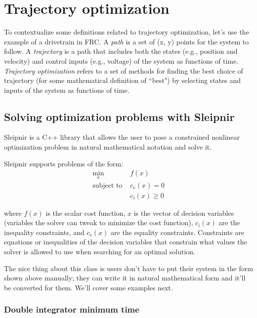 
\chapter{Trajectory optimization}

To contextualize some definitions related to trajectory optimization, let's use
the example of a drivetrain in FRC. A \textit{path} is a set of (x, y) points
for the \gls{system} to follow. A \textit{trajectory} is a path that includes
both the states (e.g., position and velocity) and control inputs (e.g., voltage)
of the \gls{system} as functions of time. \textit{Trajectory optimization}
refers to a set of methods for finding the best choice of trajectory (for some
mathematical definition of ``best") by selecting states and inputs of the
\gls{system} as functions of time.

\section{Solving optimization problems with Sleipnir}

Sleipnir is a C++ library that allows the user to pose a constrained nonlinear
optimization problem in natural mathematical notation and solve it.

Sleipnir supports problems of the form:
\begin{align*}
  \min_x             &f(x) \\
  \text{subject to } &c_e(x) = 0 \\
                     &c_i(x) \geq 0
\end{align*}

where $f(x)$ is the scalar cost function, $x$ is the vector of decision
variables (variables the solver can tweak to minimize the cost function),
$c_i(x)$ are the inequality constraints, and $c_e(x)$ are the equality
constraints. Constraints are equations or inequalities of the decision variables
that constrain what values the solver is allowed to use when searching for an
optimal solution.

The nice thing about this class is users don't have to put their system in the
form shown above manually; they can write it in natural mathematical form and
it'll be converted for them. We'll cover some examples next.

\subsection{Double integrator minimum time}


